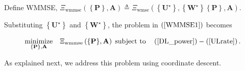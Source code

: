 \documentclass[10pt,journal]{IEEEtran}
\newcommand{\paren}[1]{\left({#1}\right)}
\newcommand{\bracket}[1]{{\left [{#1}\right ]}}
\newcommand{\braces}[1]{{\left\{ {#1}\right\}}}
\newcommand{\rr}{_\mathrm{r}}
\newcommand{\B}{\textrm{B}}
\newcommand{\WBj}{\mathbf{W}_{\mathrm{d},j}\bracket{k}}
\theoremstyle{definition}
\begin{document}
Define WMMSE, $\Xi_{\textrm{wmmse}}\paren{\braces{\mathbf{P}},\mathbf{A}}\triangleq\Xi_{\textrm{wmse}}\paren{\braces{\mathbf{U}^\star}, \braces{\mathbf{W}^\star} \braces{\mathbf{P}},\mathbf{A}}$. %

Substituting $\braces{\mathbf{U}^\star}$ and $\braces{\mathbf{W}^\star}$, the problem in $\paren{\ref{WMMSE1}}$ becomes\par\noindent\small
\begin{equation}
\label{WMMSE2}
\underset{{\braces{\mathbf{P}},\mathbf{A}}}{\textrm{minimize}}\quad\Xi_{\textrm{wmmse}}\paren{\braces{\mathbf{P}},\mathbf{A}}\;\textrm{subject to}\quad  \paren{\mathrm{\ref{DL_power}}}-\paren{\mathrm{\ref{ULrate}}}.
\end{equation}\normalsize

As explained next, we address this problem using coordinate descent.
\end{document}
